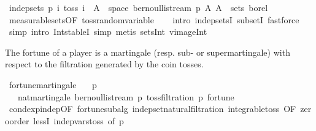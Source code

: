 \begin{isabellebody}
\ {\isachardoublequoteopen}indep{\isacharunderscore}{\kern0pt}sets\ p\ {\isacharparenleft}{\kern0pt}{\isasymlambda}i{\isachardot}{\kern0pt}\ {\isacharbraceleft}{\kern0pt}toss\ i\ {\isacharminus}{\kern0pt}{\isacharbackquote}{\kern0pt}\ A\ {\isasyminter}\ space\ {\isacharparenleft}{\kern0pt}bernoulli{\isacharunderscore}{\kern0pt}stream\ p{\isacharparenright}{\kern0pt}\ {\isacharbar}{\kern0pt}A{\isachardot}{\kern0pt}\ A\ {\isasymin}\ sets\ borel{\isacharbraceright}{\kern0pt}{\isacharparenright}{\kern0pt}\ {\isacharbraceleft}{\kern0pt}{}{\isachardot}{\kern0pt}{\isachardot}{\kern0pt}{\isacharbraceright}{\kern0pt}{\isachardoublequoteclose}\ \isamarkupfalse%
\ measurable{\isacharunderscore}{\kern0pt}sets{\isacharbrackleft}{\kern0pt}OF\ toss{\isachardot}{\kern0pt}random{\isacharunderscore}{\kern0pt}variable{\isacharbrackright}{\kern0pt}\isanewline
\ \ \isamarkupfalse%
\ {\isacharparenleft}{\kern0pt}intro\ indep{\isacharunderscore}{\kern0pt}setsI\ subsetI{\isacharparenright}{\kern0pt}\ fastforce\isanewline
{}\isamarkupfalse%
\ {\isacharparenleft}{\kern0pt}simp{\isacharcomma}{\kern0pt}\ intro\ Int{\isacharunderscore}{\kern0pt}stableI{\isacharcomma}{\kern0pt}\ simp{\isacharcomma}{\kern0pt}\ metis\ sets{\isachardot}{\kern0pt}Int\ vimage{\isacharunderscore}{\kern0pt}Int{\isacharparenright}{\kern0pt}%
\endisatagproof
{\isafoldproof}%
%
\isadelimproof
%
\endisadelimproof
%
\begin{isamarkuptext}%
The fortune of a player is a martingale (resp. sub- or supermartingale) with respect to the filtration generated by the coin tosses.%
\end{isamarkuptext}\isamarkuptrue%
\isamarkupfalse%
\ fortune{\isacharunderscore}{\kern0pt}martingale{\isacharcolon}{\kern0pt}\isanewline
\ \ \ {\isachardoublequoteopen}p\ {\isacharequal}{\kern0pt}\ {}{\isacharslash}{\kern0pt}{}{\isachardoublequoteclose}\isanewline
\ \ \ {\isachardoublequoteopen}nat{\isacharunderscore}{\kern0pt}martingale\ {\isacharparenleft}{\kern0pt}bernoulli{\isacharunderscore}{\kern0pt}stream\ p{\isacharparenright}{\kern0pt}\ {\isacharparenleft}{\kern0pt}toss{\isacharunderscore}{\kern0pt}filtration\ p{\isacharparenright}{\kern0pt}\ fortune{\isachardoublequoteclose}\isanewline
%
\isadelimproof
\ \ %
\endisadelimproof
%
\isatagproof
{}\isamarkupfalse%
\ cond{\isacharunderscore}{\kern0pt}exp{\isacharunderscore}{\kern0pt}indep{\isacharbrackleft}{\kern0pt}OF\ fortune{\isachardot}{\kern0pt}subalg\ indep{\isacharunderscore}{\kern0pt}set{\isacharunderscore}{\kern0pt}natural{\isacharunderscore}{\kern0pt}filtration\ integrable{\isacharunderscore}{\kern0pt}toss{\isacharcomma}{\kern0pt}\ OF\ zero{\isacharunderscore}{\kern0pt}order{\isacharparenleft}{\kern0pt}{}{\isacharparenright}{\kern0pt}\ lessI\ indep{\isacharunderscore}{\kern0pt}vars{\isacharunderscore}{\kern0pt}toss{\isacharcomma}{\kern0pt}\ of\ p{\isacharbrackright}{\kern0pt}\ \isanewline

\end{isabellebody}
